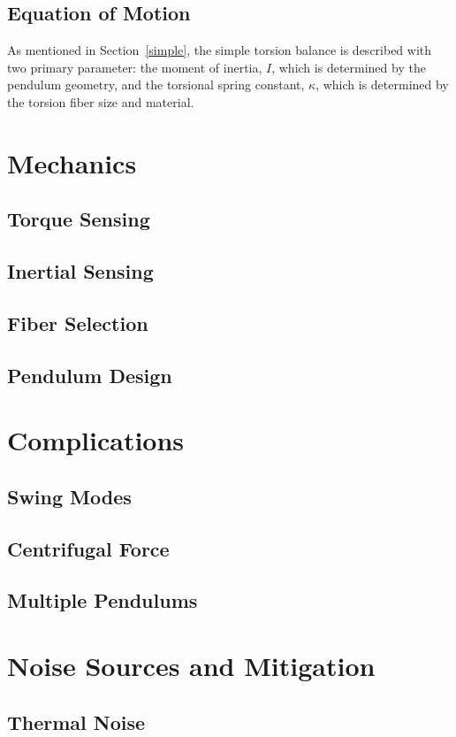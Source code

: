 \documentclass{article}
\begin{document}
\subsection{Equation of Motion}

As mentioned in Section~\ref{simple}, the simple torsion balance is described with two primary parameter: the moment of inertia, $I$, which is determined by the pendulum geometry, and the torsional spring constant, $\kappa$, which is determined by the torsion fiber size and material. 

\section{Mechanics}
\subsection{Torque Sensing}
\subsection{Inertial Sensing}
\subsection{Fiber Selection}
\subsection{Pendulum Design}

\section{Complications}
\subsection{Swing Modes} \label{swing}
\subsection{Centrifugal Force}
\subsection{Multiple Pendulums}

\section{Noise Sources and Mitigation}
\subsection{Thermal Noise}
\end{document}
